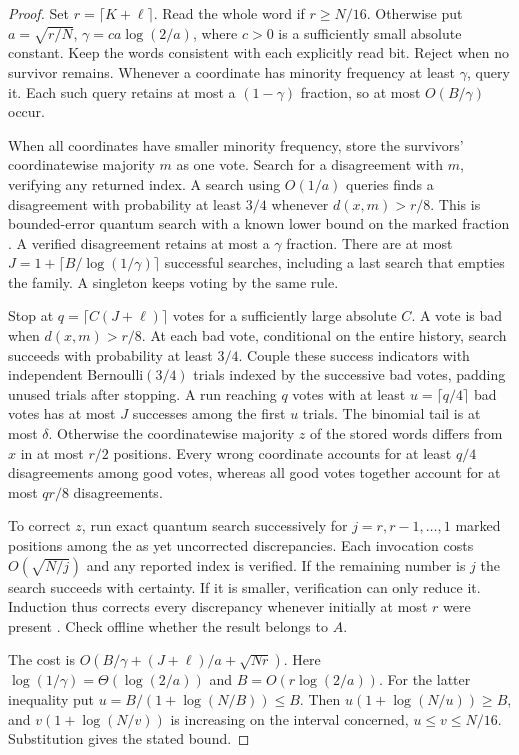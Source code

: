 \begin{proof}
Set $r=\lceil K+\ell\rceil$. Read the whole word if $r\ge N/16$. Otherwise put $a=\sqrt{r/N}$, $\gamma=c a\log(2/a)$, where $c>0$ is a sufficiently small absolute constant. Keep the words consistent with each explicitly read bit. Reject when no survivor remains. Whenever a coordinate has minority frequency at least $\gamma$, query it. Each such query retains at most a $(1-\gamma)$ fraction, so at most $O(B/\gamma)$ occur.

When all coordinates have smaller minority frequency, store the survivors' coordinatewise majority $m$ as one vote. Search for a disagreement with $m$, verifying any returned index. A search using $O(1/a)$ queries finds a disagreement with probability at least $3/4$ whenever $d(x,m)>r/8$. This is bounded-error quantum search with a known lower bound on the marked fraction \cite{dw}. A verified disagreement retains at most a $\gamma$ fraction. There are at most $J=1+\lceil B/\log(1/\gamma)\rceil$ successful searches, including a last search that empties the family. A singleton keeps voting by the same rule.

Stop at $q=\lceil C(J+\ell)\rceil$ votes for a sufficiently large absolute $C$. A vote is bad when $d(x,m)>r/8$. At each bad vote, conditional on the entire history, search succeeds with probability at least $3/4$. Couple these success indicators with independent Bernoulli$(3/4)$ trials indexed by the successive bad votes, padding unused trials after stopping. A run reaching $q$ votes with at least $u=\lceil q/4\rceil$ bad votes has at most $J$ successes among the first $u$ trials. The binomial tail is at most $\delta$. Otherwise the coordinatewise majority $z$ of the stored words differs from $x$ in at most $r/2$ positions. Every wrong coordinate accounts for at least $q/4$ disagreements among good votes, whereas all good votes together account for at most $qr/8$ disagreements.

To correct $z$, run exact quantum search successively for $j=r,r-1,\ldots,1$ marked positions among the as yet uncorrected discrepancies. Each invocation costs $O(\sqrt{N/j})$ and any reported index is verified. If the remaining number is $j$ the search succeeds with certainty. If it is smaller, verification can only reduce it. Induction thus corrects every discrepancy whenever initially at most $r$ were present \cite{dw}. Check offline whether the result belongs to $A$.

The cost is $O(B/\gamma+(J+\ell)/a+\sqrt{Nr})$. Here $\log(1/\gamma)=\Theta(\log(2/a))$ and $B=O(r\log(2/a))$. For the latter inequality put $u=B/(1+\log(N/B))\le B$. Then $u(1+\log(N/u))\ge B$, and $v(1+\log(N/v))$ is increasing on the interval concerned, $u\le v\le N/16$. Substitution gives the stated bound.
\end{proof}

